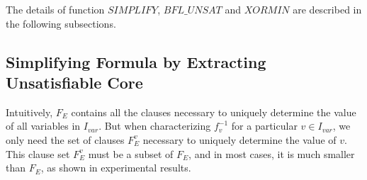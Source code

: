 \documentclass[journal]{IEEEtran}
\begin{document}
\vspace{0.2cm}

%
%
%
%
%

The details of function $SIMPLIFY$, $BFL\_UNSAT$ and $XORMIN$ are described in the following subsections.

\subsection{Simplifying Formula by Extracting Unsatisfiable Core}\label{subsec_sim}
Intuitively,
$F_E$ contains all the clauses necessary to uniquely determine the value of all variables in $I_{var}$.
But when characterizing $f_v^{-1}$ for a particular $v\in I_{var}$,
we only need the set of clauses $F_E^v$ necessary to uniquely determine the value of $v$.
This clause set $F_E^v$ must be a subset of $F_E$,
and in most cases,
it is much smaller than $F_E$,
as shown in experimental results.
\end{document}
